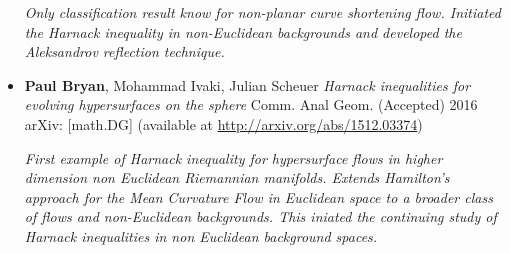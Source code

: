 \documentclass[12pt]{article}
\begin{document}
\begin{itemize}
\emph{Only classification result know for non-planar curve shortening flow. Initiated the Harnack inequality in non-Euclidean backgrounds and developed the Aleksandrov reflection technique.}

\item \textbf{Paul Bryan}, Mohammad Ivaki, Julian Scheuer \emph{Harnack inequalities for evolving hypersurfaces on the sphere} Comm. Anal Geom. (Accepted) 2016 arXiv: [math.DG] (available at \url{http://arxiv.org/abs/1512.03374})

\emph{First example of Harnack inequality for hypersurface flows in higher dimension non Euclidean Riemannian manifolds. Extends Hamilton's approach for the Mean Curvature Flow in Euclidean space to a broader class of flows and non-Euclidean backgrounds. This iniated the continuing study of Harnack inequalities in non Euclidean background spaces.}
\end{itemize}
\end{document}
